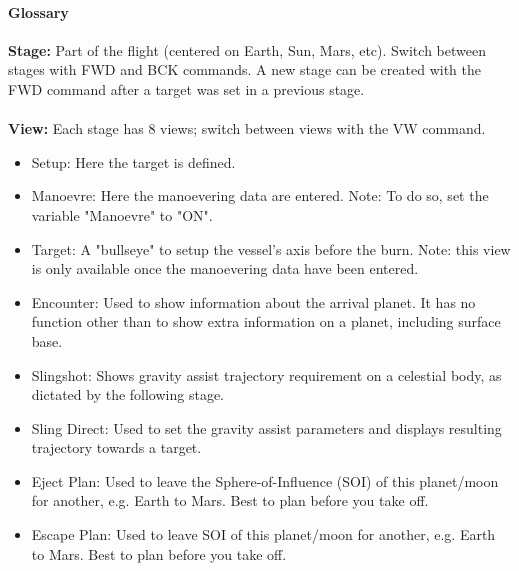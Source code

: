 \documentclass[Orbiter User Manual.tex]{subfiles}
\begin{document}
\paragraph{Glossary}
\textbf{Stage:} Part of the flight (centered on Earth, Sun, Mars, etc). Switch between stages with FWD and BCK commands. A new stage can be created with the FWD command after a target was set in a previous stage.\\
\\
\textbf{View:} Each stage has 8 views; switch between views with the VW command.
\begin{itemize}
\item Setup: Here the target is defined.
\item Manoevre: Here the manoevering data are entered. Note: To do so, set the variable "Manoevre" to "ON".
\item Target: A "bullseye" to setup the vessel's axis before the burn. Note: this view is only available once the manoevering data have been entered.
\item Encounter: Used to show information about the arrival planet. It has no function other than to show extra information on a planet, including surface base.
\item Slingshot: Shows gravity assist trajectory requirement on a celestial body, as dictated by the following stage.
\item Sling Direct: Used to set the gravity assist parameters and displays resulting trajectory towards a target.
\item Eject Plan: Used to leave the Sphere-of-Influence (SOI) of this planet/moon for another, e.g. Earth to Mars. Best to plan before you take off.
\item Escape Plan: Used to leave SOI of this planet/moon for another, e.g. Earth to Mars. Best to plan before you take off.
\end{itemize}

\noindent
\end{document}
